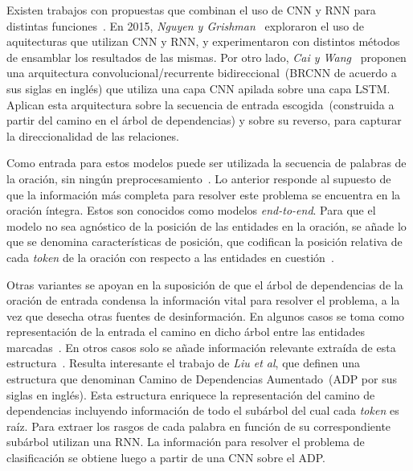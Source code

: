 Existen trabajos con propuestas que combinan el uso de CNN y RNN para distintas funciones~\cite{liu2015dependency, nguyen2015combining, cai2016bidirectional}.
En 2015, \textit{Nguyen y Grishman}~\cite{nguyen2015combining} exploraron el uso de aquitecturas que utilizan CNN y RNN, y experimentaron con distintos métodos de ensamblar los resultados de las mismas.
Por otro lado, \textit{Cai y Wang}~\cite{cai2016bidirectional} proponen una arquitectura convolucional/recurrente bidireccional~(BRCNN de acuerdo a sus siglas en inglés) que utiliza una capa CNN apilada sobre una capa LSTM.
Aplican esta arquitectura sobre la secuencia de entrada escogida~(construida a partir del camino en el árbol de dependencias) y sobre su reverso, para capturar la direccionalidad de las relaciones.

Como entrada para estos modelos puede ser utilizada la secuencia de palabras de la oración, sin ningún preprocesamiento~\cite{zeng2014relation, santos2015classifying, nguyen2015relation, huang2016attention, wang2016relation, xiao2016semantic}.
Lo anterior responde al supuesto de que la información más completa para resolver este problema se encuentra en la oración íntegra.
Estos son conocidos como modelos \textit{end-to-end}.
Para que el modelo no sea agnóstico de la posición de las entidades en la oración, se añade lo que se denomina características de posición, que codifican la posición relativa de cada \textit{token} de la oración con respecto a las entidades en cuestión~\cite{zeng2014relation, santos2015classifying, nguyen2015relation, zhang2015bidirectional,nguyen2015combining,huang2016attention, wang2016relation, xiao2016semantic, lee2019semantic}.

Otras variantes se apoyan en la suposición de que el árbol de dependencias de la oración de entrada condensa la información vital para resolver el problema, a la vez que desecha otras fuentes de desinformación.
En algunos casos se toma como representación de la entrada el camino en dicho árbol entre las entidades marcadas~\cite{socher2012semantic, xu2015classifying, hashimoto2015task, xu2015semantic, liu2015dependency, ebrahimi2015chain}.
En otros casos solo se añade información relevante extraída de esta estructura~\cite{zhang2015bidirectional}.
Resulta interesante el trabajo de \textit{Liu et al}, que definen una estructura que denominan Camino de Dependencias Aumentado~(ADP por sus siglas en inglés).
Esta estructura enriquece la representación del camino de dependencias incluyendo información de todo el subárbol del cual cada \textit{token} es raíz. 
Para extraer los rasgos de cada palabra en función de su correspondiente subárbol utilizan una RNN.
La información para resolver el problema de clasificación se obtiene luego a partir de una CNN sobre el ADP.


